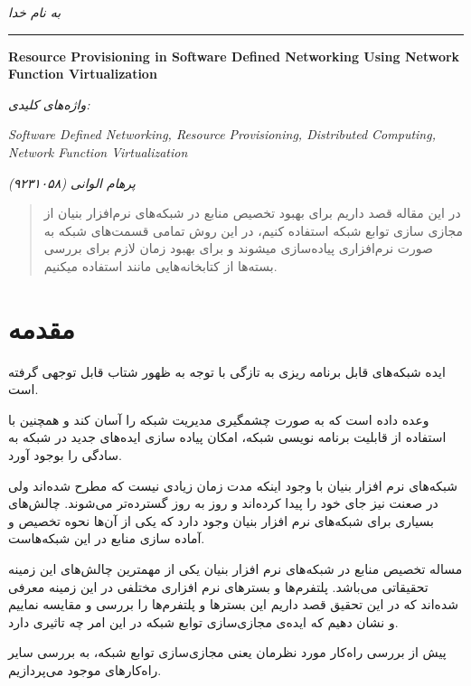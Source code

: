 ﻿\documentclass[11pt]{article}
\begin{document}
\begin{titlepage}
	\centering
	\emph{به نام خدا}\par
	\vspace{.5cm}
\rule{\textwidth}{1pt}
	\vspace{.25cm}
	\begin{latin}
		{\huge\bfseries Resource Provisioning in Software Defined Networking Using Network Function Virtualization} \par
	\end{latin}
	\vspace{.5cm}
	\emph{واژه‌های کلیدی:}
	\vspace{.1cm}
	\begin{latin}
		\emph{Software Defined Networking, Resource Provisioning, Distributed Computing, Network Function Virtualization}
	\end{latin}
	\emph{پرهام الوانی (۹۲۳۱۰۵۸)}
\end{titlepage}
\begin{abstract}
	در این مقاله قصد داریم برای بهبود تخصیص منابع در شبکه‌های نرم‌افزار بنیان از مجازی سازی توابع شبکه استفاده کنیم، در این روش تمامی قسمت‌های شبکه به صورت نرم‌افزاری پیاده‌سازی میشوند و برای بهبود زمان لازم برای بررسی بسته‌ها از کتابخانه‌هایی مانند  استفاده میکنیم.
\end{abstract}
\section{مقدمه}

\par
ایده شبکه‌های قابل برنامه ریزی به تازگی با توجه به ظهور  شتاب قابل توجهی گرفته است.
\par
  وعده داده است که به صورت چشمگیری مدیریت شبکه را آسان کند و همچنین با استفاده از قابلیت برنامه نویسی شبکه، امکان پیاده سازی ایده‌های جدید در شبکه به سادگی را بوجود آورد.
\par
شبکه‌های نرم افزار بنیان با وجود اینکه مدت زمان زیادی نیست که مطرح شده‌اند ولی در صعنت نیز جای خود را پیدا کرده‌اند و روز به روز گسترده‌تر می‌شوند. چالش‌های بسیاری برای شبکه‌های نرم افزار بنیان وجود دارد که یکی از آن‌ها نحوه تخصیص و آماده سازی منابع در این شبکه‌هاست.
\par
مساله تخصیص منابع در شبکه‌های نرم افزار بنیان یکی از مهمترین چالش‌های این زمینه تحقیقاتی می‌باشد. پلتفرم‌ها و بستر‌های نرم افزاری مختلفی در این زمینه معرفی شده‌اند که در این تحقیق قصد داریم این بستر‌ها و پلتفرم‌ها را بررسی و مقایسه نماییم و نشان دهیم که ایده‌ی مجازی‌سازی توابع شبکه در این امر چه تاثیری دارد. 
\par
پیش از بررسی راه‌کار مورد نظرمان یعنی مجازی‌سازی توابع شبکه، به بررسی سایر راه‌کار‌های موجود می‌پردازیم.
\end{document}
